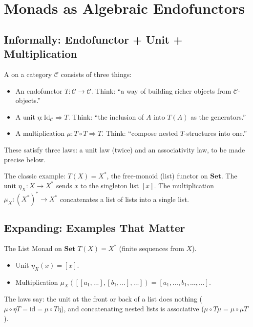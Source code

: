 \section{Monads as Algebraic Endofunctors}
\label{sec:monads-defn}

\subsection{Informally: Endofunctor + Unit + Multiplication}

A  on a category $\mathcal{C}$ consists of three things:
\begin{itemize}
  \item An endofunctor $T : \mathcal{C} \to \mathcal{C}$. Think: ``a way
        of building richer objects from $\mathcal{C}$-objects.''
  \item A unit $\eta : \mathrm{Id}_\mathcal{C} \Rightarrow T$. Think:
        ``the inclusion of $A$ into $T(A)$ as the generators.''
  \item A multiplication $\mu : T \circ T \Rightarrow T$. Think:
        ``compose nested $T$-structures into one.''
\end{itemize}
These satisfy three laws: a unit law (twice) and an associativity law,
to be made precise below.

The classic example: $T(X) = X^*$, the free-monoid (list) functor on
$\mathbf{Set}$. The unit $\eta_X : X \to X^*$ sends $x$ to the singleton
list $[x]$. The multiplication $\mu_X : (X^*)^* \to X^*$ concatenates a
list of lists into a single list.

\subsection{Expanding: Examples That Matter}

\begin{example}{The List Monad on $\mathbf{Set}$}
$T(X) = X^*$ (finite sequences from $X$).
\begin{itemize}
  \item Unit $\eta_X(x) = [x]$.
  \item Multiplication $\mu_X([[a_1, \ldots], [b_1, \ldots], \ldots]) =
        [a_1, \ldots, b_1, \ldots, \ldots]$.
\end{itemize}
The laws say: the unit at the front or back of a list does nothing
($\mu \circ \eta T = \mathrm{id} = \mu \circ T \eta$), and concatenating
nested lists is associative ($\mu \circ T \mu = \mu \circ \mu T$).
\end{example}

